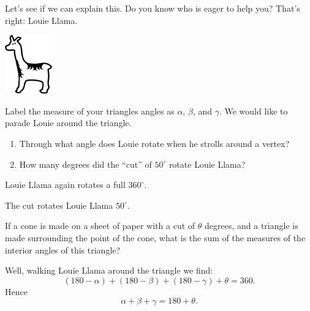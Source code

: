 \documentclass[nooutcomes,noauthor]{ximera}
\begin{document}
\begin{question}
  Let's see if we can explain this. Do you know who is eager to help
you? That's right: Louie Llama.
\begin{center}
\includegraphics[height=1in]{llama.pdf}
\end{center}

Label the measure of your triangles angles as $\alpha$, $\beta$, and
$\gamma$. We would like to parade Louie around the triangle.
\begin{enumerate}
\item Through what angle does Louie rotate when he strolls around a
  vertex?
\item How many degrees did the ``cut'' of $50^\circ$ rotate Louie
  Llama?
\end{enumerate}
\begin{freeResoponse}
\item Louie Llama again rotates a full $360^\circ$.
\item The cut rotates Louie Llama $50^\circ$.
\end{freeResoponse}
\end{question}

\mynewpage


\begin{question}
If a cone is made on a sheet of paper with a cut of $\theta$ degrees,
and a triangle is made surrounding the point of the cone, what is the
sum of the measures of the interior angles of this triangle?
\begin{freeResponse}
  Well, walking Louie Llama around the triangle we find:
  \[
  (180-\alpha) + (180-\beta) + (180-\gamma) + \theta = 360.
  \]
  Hence
  \[
  \alpha + \beta + \gamma = 180 + \theta.
  \]
\end{freeResponse}
\end{question}
\end{document}
